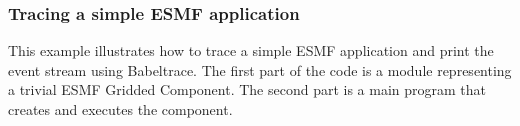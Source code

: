  
\setlength{\oldparskip}{\parskip}
\setlength{\parskip}{1.5ex}
\setlength{\oldparindent}{\parindent}
\setlength{\parindent}{0pt}
\setlength{\oldbaselineskip}{\baselineskip}
\setlength{\baselineskip}{11pt}
 
\def\bv{\begin{verbatim}}
\def\ev{\end{verbatim}}
\def\be{\begin{equation}}
\def\ee{\end{equation}}
\def\bea{\begin{eqnarray}}
\def\eea{\end{eqnarray}}
\def\bi{\begin{itemize}}
\def\ei{\end{itemize}}
\def\bn{\begin{enumerate}}
\def\en{\end{enumerate}}
\def\bd{\begin{description}}
\def\ed{\end{description}}
\def\({\left (}
\def\){\right )}
\def\[{\left [}
\def\]{\right ]}
\def\<{\left  \langle}
\def\>{\right \rangle}
\def\cI{{\cal I}}
\def\diag{\mathop{\rm diag}}
\def\tr{\mathop{\rm tr}}


 

   \subsubsection{Tracing a simple ESMF application} \label{ex:TraceEx}
  
   This example illustrates how to trace a simple ESMF
   application and print the event stream using Babeltrace.
   The first part of the code is a module representing
   a trivial ESMF Gridded Component.  The second part is a
   main program that creates and executes the component. 

